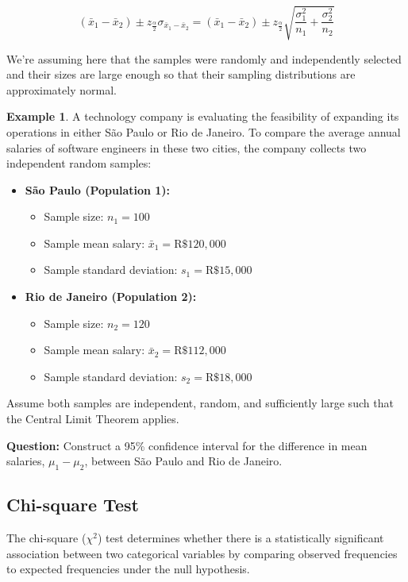 \documentclass[12pt]{book}
\theoremstyle{definition}
\newtheorem{exmp}{Example}[section]
\begin{document}
\begin{equation}
    (\bar{x}_1 - \bar{x}_2) \pm z_{\frac {\alpha} {2}} \sigma_{\bar{x}_1 - \bar{x}_2} = (\bar{x}_1 - \bar{x}_2) \pm z_{\frac {\alpha} {2}} \sqrt{\frac{\sigma_1^2} {n_1} + \frac{\sigma_2^2} {n_2}}
\end{equation}

We're assuming here that the samples were randomly and independently selected and their sizes are large enough so that their sampling distributions are approximately normal.

\begin{exmp}
    A technology company is evaluating the feasibility of expanding its operations in either São Paulo or Rio de Janeiro. To compare the average annual salaries of software engineers in these two cities, the company collects two independent random samples:

    \begin{itemize}
    \item \textbf{São Paulo (Population 1):}
    \begin{itemize}
        \item Sample size: $n_1 = 100$
        \item Sample mean salary: $\bar{x}_1 = \text{R\$}120{,}000$
        \item Sample standard deviation: $s_1 = \text{R\$}15{,}000$
    \end{itemize}

    \item \textbf{Rio de Janeiro (Population 2):}
    \begin{itemize}
        \item Sample size: $n_2 = 120$
        \item Sample mean salary: $\bar{x}_2 = \text{R\$}112{,}000$
        \item Sample standard deviation: $s_2 = \text{R\$}18{,}000$
    \end{itemize}
    \end{itemize}

    Assume both samples are independent, random, and sufficiently large such that the Central Limit Theorem applies.

    \bigskip

    \textbf{Question:} Construct a 95\% confidence interval for the difference in mean salaries, $\mu_1 - \mu_2$, between São Paulo and Rio de Janeiro.
\end{exmp}

\subsection{Chi-square Test}
The chi-square ($\chi^2$) test determines whether there is a statistically significant association between two categorical variables by comparing observed frequencies to expected frequencies under the null hypothesis.
\end{document}
